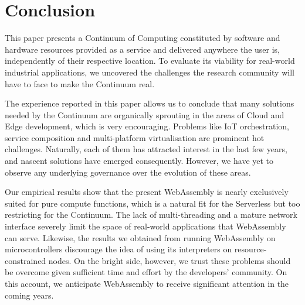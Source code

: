 \section{Conclusion}
\label{sec:conclusion}

This paper presents a Continuum of Computing constituted by software and hardware resources provided as a service and delivered anywhere the user is, independently of their respective location. 
To evaluate its viability for real-world industrial applications, we uncovered the challenges the research community will have to face to make the Continuum real. 


The experience reported in this paper allows us to conclude that many solutions needed by the Continuum are organically sprouting in the areas of Cloud and Edge development, which is very encouraging. Problems like IoT orchestration, service composition and multi-platform virtualisation are prominent hot challenges. Naturally, each of them has attracted interest in the last few years, and nascent solutions have emerged consequently. However, we have yet to observe any underlying governance over the evolution of these areas.

Our empirical results show that the present WebAssembly is nearly exclusively suited for pure compute functions, which is a natural fit for the Serverless but too restricting for the Continuum. The lack of multi-threading and a mature network interface severely limit the space of real-world applications that WebAssembly can serve.
Likewise, the results we obtained from running WebAssembly on microcontrollers discourage the idea of using its interpreters on resource-constrained nodes. On the bright side, however, we trust these problems should be overcome given sufficient time and effort by the developers' community. On this account, we anticipate WebAssembly to receive significant attention in the coming years.


